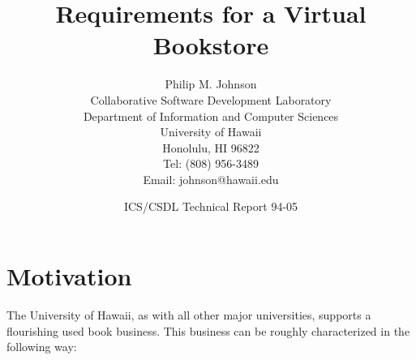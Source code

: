 





\title{Requirements for a Virtual Bookstore}
\author{Philip M. Johnson\\
  Collaborative Software Development Laboratory\\
  Department of Information and Computer Sciences\\
  University of Hawaii\\
  Honolulu, HI 96822\\
  Tel: (808) 956-3489\\
  Email: johnson@hawaii.edu}

\date{ICS/CSDL Technical Report 94-05}


\maketitle 

\section{Motivation}

The University of Hawaii, as with all other major universities, supports a
flourishing used book business.  This business can be roughly characterized
in the following way:

